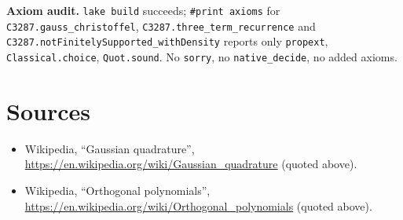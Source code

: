 \documentclass[11pt]{article}
\theoremstyle{definition}
\begin{document}
\textbf{Axiom audit.} \texttt{lake build} succeeds; \texttt{\#print axioms} for
\texttt{C3287.gauss\_christoffel}, \texttt{C3287.three\_term\_recurrence} and
\texttt{C3287.notFinitelySupported\_withDensity} reports only \texttt{propext},
\texttt{Classical.choice}, \texttt{Quot.sound}. No \texttt{sorry}, no \texttt{native\_decide}, no
added axioms.

\section{Sources}
\begin{itemize}
\item Wikipedia, ``Gaussian quadrature'', \url{https://en.wikipedia.org/wiki/Gaussian_quadrature}
  (quoted above).
\item Wikipedia, ``Orthogonal polynomials'', \url{https://en.wikipedia.org/wiki/Orthogonal_polynomials}
  (quoted above).
\end{itemize}
\end{document}
